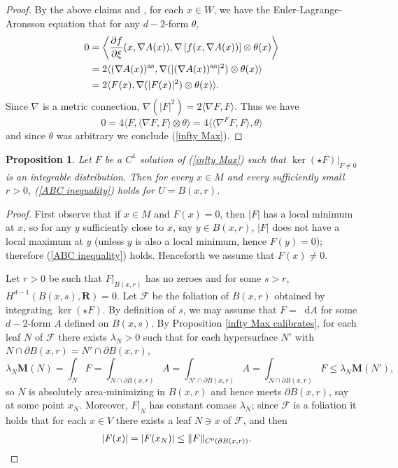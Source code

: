 \documentclass[reqno,11pt]{amsart}
\newcommand{\RR}{\mathbf{R}}
\newcommand*\dif{\mathop{}\!\mathrm{d}}
\newcommand{\Mass}{\mathbf M}
\newtheorem{proposition}[theorem]{Proposition}
\theoremstyle{definition}
\numberwithin{equation}{section}
\begin{document}
\begin{proof}
By the above claims and \cite[Theorem 5.2]{Barron2001}, for each $x \in W$, we have the Euler-Lagrange-Aronsson equation that for any $d - 2$-form $\theta$,
\begin{align*}
0 
&= \left\langle \frac{\partial f}{\partial \xi}(x, \nabla A(x)), \nabla \left[f(x, \nabla A(x))\right] \otimes \theta(x)\right\rangle \\
&= 2\langle (\nabla A(x))^{\rm as}, \nabla(|(\nabla A(x))^{\rm as}|^2) \otimes \theta(x)\rangle \\
&= 2\langle F(x), \nabla(|F(x)|^2) \otimes \theta(x)\rangle.
\end{align*}
Since $\nabla$ is a metric connection, $\nabla(|F|^2) = 2\langle \nabla F, F\rangle$.
Thus we have 
$$0 = 4\langle F, \langle \nabla F, F\rangle \otimes \theta\rangle = 4\langle \langle \nabla^F F, F\rangle, \theta\rangle$$
and since $\theta$ was arbitrary we conclude (\ref{infty Max}).
\end{proof}

\begin{proposition}\label{tight and integrable implies infinity maxwell}
Let $F$ be a $C^1$ solution of (\ref{infty Max}) such that $\ker(\star F)|_{F \neq 0}$ is an integrable distribution.
Then for every $x \in M$ and every sufficiently small $r > 0$, (\ref{ABC inequality}) holds for $U = B(x, r)$.
\end{proposition}
\begin{proof}
First observe that if $x \in M$ and $F(x) = 0$, then $|F|$ has a local minimum at $x$, so for any $y$ sufficiently close to $x$, say $y \in B(x, r)$, $|F|$ does not have a local maximum at $y$ (unless $y$ is also a local minimum, hence $F(y) = 0$); therefore (\ref{ABC inequality}) holds.
Henceforth we assume that $F(x) \neq 0$.

Let $r > 0$ be such that $F|_{B(x, r)}$ has no zeroes and for some $s > r$, $H^{d - 1}(B(x, s), \RR) = 0$.
Let $\mathscr F$ be the foliation of $B(x, r)$ obtained by integrating $\ker(\star F)$.
By definition of $s$, we may assume that $F = \dif A$ for some $d - 2$-form $A$ defined on $B(x, s)$.
By Proposition \ref{infty Max calibrates}, for each leaf $N$ of $\mathscr F$ there exists $\lambda_N > 0$ such that for each hypersurface $N'$ with $N \cap \partial B(x, r) = N' \cap \partial B(x, r)$,
$$\lambda_N \Mass(N) = \int_N F = \int_{N \cap \partial B(x, r)} A = \int_{N' \cap \partial B(x, r)} A = \int_{N \cap \partial B(x, r)} F \leq \lambda_N \Mass(N'),$$
so $N$ is absolutely area-minimizing in $B(x, r)$ and hence meets $\partial B(x, r)$, say at some point $x_N$.
Moreover, $F|_N$ has constant comass $\lambda_N$; since $\mathscr F$ is a foliation it holds that for each $x \in V$ there exists a leaf $N \ni x$ of $\mathscr F$, and then 
\begin{align*}
|F(x)| &= |F(x_N)| \leq \|F\|_{C^0(\partial B(x, r))}. \qedhere
\end{align*}
\end{proof}
\end{document}
